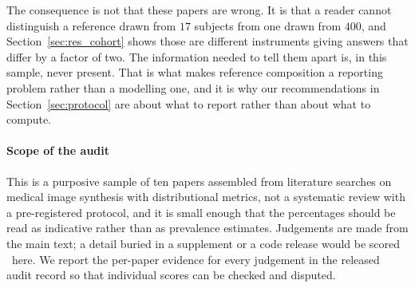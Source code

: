 The consequence is not that these papers are wrong. It is that a reader cannot
distinguish a reference drawn from $17$ subjects from one drawn from $400$,
and Section~\ref{sec:res_cohort} shows those are different instruments giving
answers that differ by a factor of two. The information needed to tell them
apart is, in this sample, never present. That is what makes reference
composition a reporting problem rather than a modelling one, and it is why our
recommendations in Section~\ref{sec:protocol} are about what to report rather
than about what to compute.

\paragraph{Scope of the audit}
This is a purposive sample of ten papers assembled from literature searches on
medical image synthesis with distributional metrics, not a systematic review
with a pre-registered protocol, and it is small enough that the percentages
should be read as indicative rather than as prevalence estimates. Judgements
are made from the main text; a detail buried in a supplement or a code release
would be scored \xmark\ here. We report the per-paper evidence for every
judgement in the released audit record so that individual scores can be
checked and disputed.
